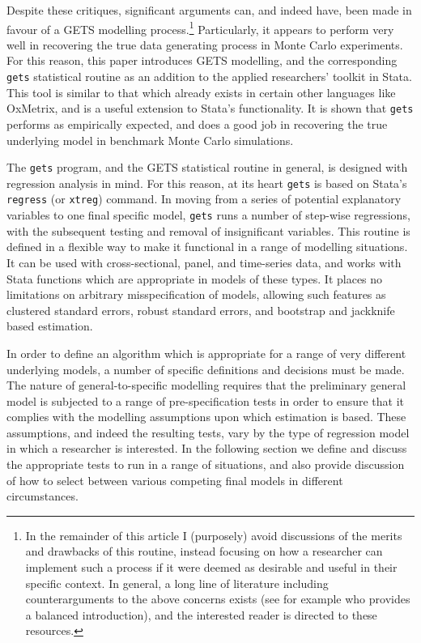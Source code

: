 \documentclass[bib]{statapress}
\begin{document}
Despite these critiques, significant arguments can, and indeed have, been made 
in favour of a GETS modelling process.\footnote{In the remainder of this 
article I (purposely) avoid discussions of the merits and drawbacks of this
routine, instead focusing on how a researcher can implement such a process if 
it were deemed as desirable and useful in their specific context.  In general,
a long line of literature including counterarguments to the above concerns 
exists (see for example \citep{Hansen1996} who provides a balanced 
introduction), and the interested reader is directed to these resources.}
Particularly, it appears to perform very well in recovering the true data
generating process in Monte Carlo experiments\citep{HooverPerez1999}.  For
this reason, this paper introduces GETS modelling, and the corresponding 
\texttt{gets} statistical routine as an addition to the applied researchers'
toolkit in Stata.  This tool is similar to that which already exists in certain
other languages like OxMetrix, and is a useful extension to Stata's 
functionality.  It is shown that \texttt{gets} performs as empirically 
expected, and does a good job in recovering the true underlying model in 
benchmark Monte Carlo simulations.

The \texttt{gets} program, and the GETS statistical routine in general, is 
designed with regression analysis in mind.  For this reason, at its heart
\texttt{gets} is based on Stata's \texttt{regress} (or \texttt{xtreg}) command.
In moving from a series of potential explanatory variables to one final 
specific model, \texttt{gets} runs a number of step-wise regressions, with
the subsequent testing and removal of insignificant variables.  This routine
is defined in a flexible way to make it functional in a range of modelling 
situations.  It can be used with cross-sectional, panel, and time-series data, 
and works with Stata functions which are appropriate in models of these types.  
It places no limitations on arbitrary misspecification of models, allowing such 
features as clustered standard errors, robust standard errors, and bootstrap 
and jackknife based estimation.  

In order to define an algorithm which is appropriate for a range of very 
different underlying models, a number of specific definitions and decisions 
must be made.  The nature of general-to-specific modelling requires that the
preliminary general model is subjected to a range of pre-specification tests 
in order to ensure that it complies with the modelling assumptions upon which 
estimation is based.  These assumptions, and indeed the resulting tests, vary
by the type of regression model in which a researcher is interested.  In the 
following section we define and discuss the appropriate tests to run in a range
of situations, and also provide discussion of how to select between various 
competing final models in different circumstances.
\end{document}
